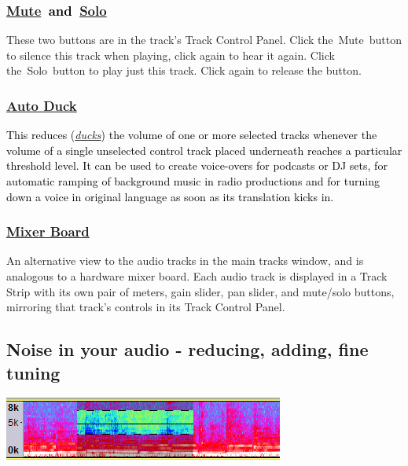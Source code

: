 \documentclass[letterpaper]{article}
\begin{document}
\subsubsection[Mute~and~Solo]{\href{https://manual.audacityteam.org/man/audio_tracks.html\#mute}{\textcolor[rgb]{0.3529412,0.21176471,0.5882353}{Mute}}\textcolor{black}{~and~}\href{https://manual.audacityteam.org/man/audio_tracks.html\#solo}{\textcolor[rgb]{0.3529412,0.21176471,0.5882353}{Solo}}}
{\color{black}
These two buttons are in the track's Track Control Panel. Click the~Mute~button to silence this track when playing,
click again to hear it again. Click the~Solo~button to play just this track. Click again to release the button.}

\subsubsection[Auto
Duck]{\href{https://manual.audacityteam.org/man/auto_duck.html}{\textcolor[rgb]{0.3529412,0.21176471,0.5882353}{Auto
Duck}}}
\textcolor{black}{This reduces
(}\href{https://en.wikipedia.org/wiki/Ducking}{\textit{\textcolor[rgb]{0.2,0.4,0.73333335}{ducks}}}\textcolor{black}{)
the volume of one or more selected tracks whenever the volume of a single unselected {\textquotedbl}control
track{\textquotedbl} placed underneath reaches a particular threshold level. It can be used to create voice-overs for
podcasts or DJ sets, for automatic {\textquotedbl}ramping{\textquotedbl} of background music in radio productions and
for turning down a voice in original language as soon as its translation kicks in.}

\subsubsection[Mixer
Board]{\href{https://manual.audacityteam.org/man/mixer_board.html}{\textcolor[rgb]{0.3529412,0.21176471,0.5882353}{Mixer
Board}}}
{\color{black}
An alternative view to the audio tracks in the main tracks window, and is analogous to a hardware mixer board. Each
audio track is displayed in a Track Strip with its own pair of meters, gain slider, pan slider, and mute/solo buttons,
mirroring that track's controls in its Track Control Panel.}

\subsection[Noise in your audio {}- reducing, adding, fine tuning]{\color{black} Noise in your audio - reducing, adding,
fine tuning}
 \includegraphics[width=9.208cm,height=2.09cm]{TourGuide-img014.png} 
\end{document}
